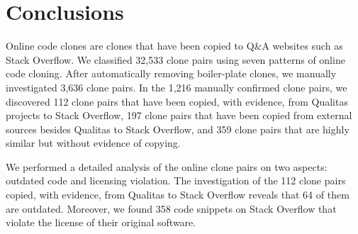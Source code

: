 \documentclass[sigconf,review, anonymous]{acmart}
\begin{document}
%

\section{Conclusions}

Online code clones are clones that have been copied to Q\&A websites
such as Stack Overflow. 
We classified 32,533 clone pairs using seven patterns of online code
cloning.  After automatically removing boiler-plate clones, we
manually investigated 3,636 clone pairs. In the 1,216 manually
confirmed clone pairs, we discovered 112 clone pairs that have been
copied, with evidence, from Qualitas projects to Stack Overflow, 197
clone pairs that have been copied from external sources besides
Qualitas to Stack Overflow, and 359 clone pairs that are highly
similar but without evidence of copying.

We performed a detailed analysis of the online clone pairs on two
aspects: outdated code and licensing violation. The investigation of
the 112 clone pairs copied, with evidence, from Qualitas to Stack
Overflow reveals that 64 of them are outdated.  Moreover, we found 358
code snippets on Stack Overflow that violate the license of their
original software.
\end{document}
